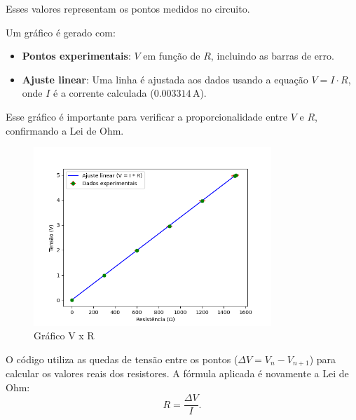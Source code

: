 \documentclass[a4paper,12pt]{article}
\begin{document}
Esses valores representam os pontos medidos no circuito.

\vspace{1em}

Um gráfico é gerado com:
\begin{itemize}
    \item \textbf{Pontos experimentais}: $V$ em função de $R$, incluindo as barras de erro.
    \item \textbf{Ajuste linear}: Uma linha é ajustada aos dados usando a equação $V = I \cdot R$, onde $I$ é a corrente calculada ($0.003314 \, \text{A}$).
\end{itemize}

Esse gráfico é importante para verificar a proporcionalidade entre $V$ e $R$, confirmando a Lei de Ohm.


\vspace{1em}

\begin{figure}[H]
    \centering
    \includegraphics[width=0.8\textwidth]{GráficoUxR.png} %
    \caption{Gráfico V x R}
    \label{fig:tinkercad}
\end{figure}

O código utiliza as quedas de tensão entre os pontos ($\Delta V = V_{n} - V_{n+1}$) para calcular os valores reais dos resistores. A fórmula aplicada é novamente a Lei de Ohm:
\[
R = \frac{\Delta V}{I}.
\]
\end{document}

